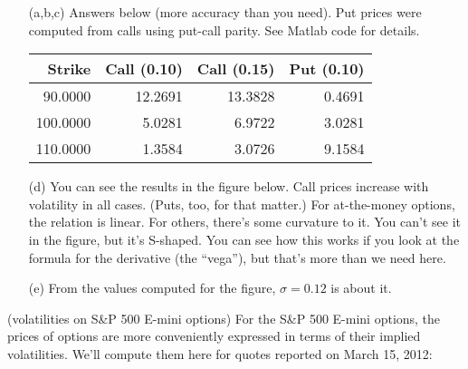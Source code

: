 \documentclass[11pt]{exam}
\begin{document}
\begin{questions}
\begin{solution}
\begin{enumerate}
\item[(a,b,c)] Answers below (more accuracy than you need).
Put prices were computed from calls using put-call parity.
See Matlab code for details.
%
\begin{center}
\begin{tabular}{rrrr}
\toprule
Strike      &  Call (0.10) & Call (0.15) & Put (0.10) \\
\midrule
   90.0000  & 12.2691  & 13.3828  &  0.4691  \\
  100.0000  &  5.0281  &  6.9722  &  3.0281  \\
  110.0000  &  1.3584  &  3.0726  &  9.1584  \\
\bottomrule
\end{tabular}
\end{center}

\item [(d)] You can see the results in the figure below.
Call prices increase with volatility in all cases.
(Puts, too, for that matter.)
For at-the-money options, the relation is linear.
For others, there's some curvature to it.
You can't see it in the figure, but it's S-shaped.
You can see how this works if you look at the formula for
the derivative (the ``vega''), but that's more than we need here.

\begin{center}
\end{center}

\item[(e)] From the values computed for the figure, $\sigma = 0.12$ is about it.

\end{enumerate}
\end{solution}


\question (volatilities on S\&P 500 E-mini options)
For the S\&P 500 E-mini options,
the prices of options are more conveniently expressed in
terms of their implied volatilities.
We'll compute them here for quotes reported on March 15, 2012:


\end{questions}
\end{document}
